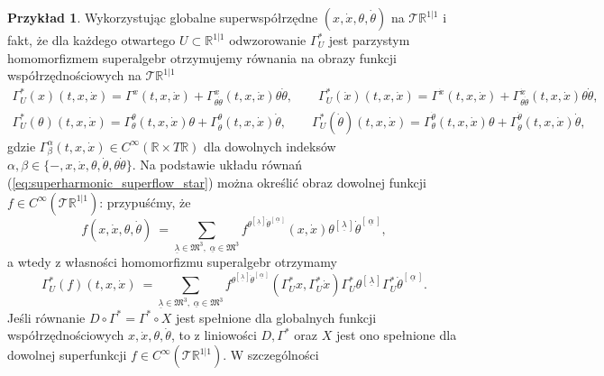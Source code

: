 \documentclass[11pt,a4paper]{report}
\theoremstyle{definition}
\newtheorem{example}[theorem]{Przykład}
\begin{document}
\begin{example}
	Wykorzystując globalne superwspółrzędne $(x, \dot x, \theta, \dot \theta)$ na $\mathcal{T} \mathbb{R}^{1|1}$ i fakt, że dla każdego otwartego $U\subset \mathbb{R}^{1|1}$ odwzorowanie $\Gamma^*_U$ jest parzystym homomorfizmem superalgebr otrzymujemy równania na obrazy funkcji współrzędnościowych na $\mathcal{T} \mathbb{R}^{1|1}$
	\begin{equation}
		\label{eq:superharmonic_superflow_star}
		\begin{gathered}
			\Gamma_U^*(x) (t,x,\dot x) =\Gamma^x(t,x,\dot x)+\Gamma^x_{\theta\dot\theta}(t,x,\dot x)\theta\dot\theta,\qquad 
			\Gamma_U^*(\dot x) (t,x,\dot x) =\Gamma^{\dot x}(t,x,\dot x)+\Gamma^{\dot x}_{\theta\dot\theta}(t,x,\dot x)\theta\dot\theta, \\
			\Gamma_U^*(\theta) (t,x,\dot x) =\Gamma^\theta_\theta(t,x,\dot x) \theta+\Gamma^\theta_{\dot\theta}(t,x,\dot x) \dot \theta,\qquad
			\Gamma_U^*(\dot\theta) (t,x,\dot x) =\Gamma^{\dot \theta}_\theta(t,x,\dot x) \theta+\Gamma^{\dot \theta}_{\dot\theta}(t,x,\dot x) \dot \theta,
		\end{gathered}
	\end{equation}
	gdzie $\Gamma^\alpha_\beta (t,x,\dot x) \in C^\infty (\mathbb{R}\times T \mathbb{R})$ dla dowolnych indeksów $\alpha, \beta \in \{ - ,x, \dot x, \theta, \dot \theta, \theta \dot \theta \}$. Na podstawie układu równań (\ref{eq:superharmonic_superflow_star}) można określić obraz dowolnej funkcji $f \in C^\infty(\mathcal{T} \mathbb{R}^{1|1})$: przypuśćmy, że $$f(x, \dot x, \theta, \dot \theta)\ = \!\!\!\!\!\!\!\!
	\sum_{\underline{\lambda} \in \mathfrak{M}^3,\; \underline{\alpha} \in \mathfrak{M}^3} \!\!\!\!\!\!\!\! f^{\theta^{\left[\, \underline{\lambda}\, \right]} \dot \theta^{\left[\, \underline{\alpha}\, \right]}} (x, \dot x) \theta^{\left[\, \underline{\lambda}\, \right]} \dot \theta^{\left[\, \underline{\alpha}\, \right]},$$
	a wtedy z własności homomorfizmu superalgebr otrzymamy
	\begin{equation*}
		\Gamma_U^* (f) (t,x, \dot x)\ = \!\!\!\!\!\!\!\!
		\sum_{\underline{\lambda} \in \mathfrak{M}^3,\; \underline{\alpha} \in \mathfrak{M}^3} \!\!\!\!\!\!\!\! f^{\theta^{\left[\, \underline{\lambda}\, \right]} \dot \theta^{\left[\, \underline{\alpha}\, \right]}} (\Gamma^*_U x, \Gamma^*_U \dot x) \Gamma^*_U \theta^{\left[\, \underline{\lambda}\, \right]} \Gamma^*_U \dot \theta^{\left[\, \underline{\alpha}\, \right]}.
	\end{equation*}
	Jeśli równanie $D \circ \Gamma^* = \Gamma^* \circ X$ jest spełnione dla globalnych funkcji współrzędnościowych $x, \dot x, \theta, \dot \theta$, to z liniowości $D, \Gamma^*$ oraz $X$ jest ono spełnione dla dowolnej superfunkcji $f \in C^\infty (\mathcal{T} \mathbb{R}^{1|1})$. W szczególności \\[-7pt]

\end{example}
\end{document}
